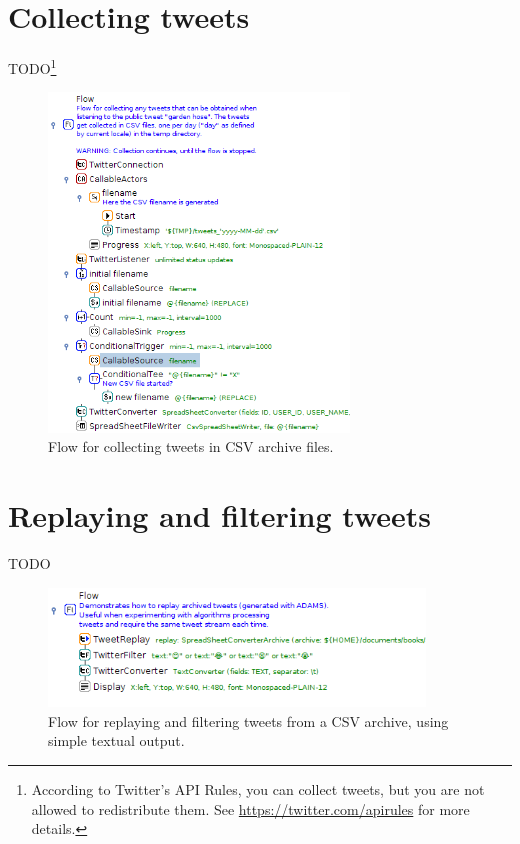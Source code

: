 \documentclass[a4paper,10pt]{book}
\begin{document}
\section{Collecting tweets}
TODO\footnote{According to Twitter's API Rules, you can collect tweets, but you are not allowed to redistribute them. See \url{https://twitter.com/apirules}{} for more details.}

\begin{figure}[htb]
  \centering
  \includegraphics[width=8.0cm]{images/collect_tweets-flow.png}
  \caption{Flow for collecting tweets in CSV archive files.}
  \label{collect_tweets-flow}
\end{figure}

\section{Replaying and filtering tweets}
TODO

\begin{figure}[htb]
  \centering
  \includegraphics[width=10.0cm]{images/replay_and_filter_tweets-flow.png}
  \caption{Flow for replaying and filtering tweets from a CSV archive, using simple textual output.}
  \label{replay_and_filter_tweets-flow}
\end{figure}
\end{document}
